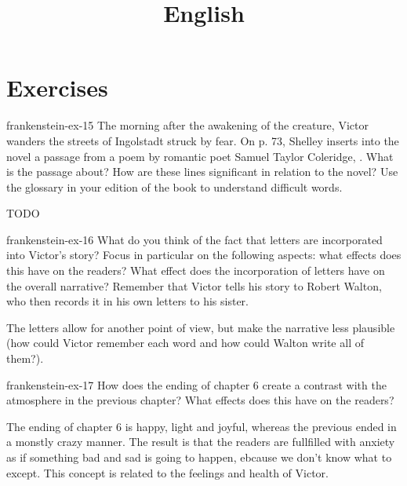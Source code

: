 \documentclass[preview]{standalone}
\begin{document}
\title{English}
\genpage

\section{Exercises}

\begin{snippetexercise}{frankenstein-ex-15}
    {The morning after the awakening of the creature, Victor wanders the streets of Ingolstadt struck
    by fear. On p. 73, Shelley inserts into the novel a passage from a poem by romantic poet Samuel
    Taylor Coleridge, . What is the passage about? How are these
    lines significant in relation to the novel? Use the glossary in your edition of the book to understand
    difficult words.}
    
    \begin{center}
    \end{center}
    
    TODO 
\end{snippetexercise}

\begin{snippetexercise}{frankenstein-ex-16}
    {What do you think of the fact that letters are incorporated into Victor's story? Focus in particular
    on the following aspects: what effects does this have on the readers? What effect does the
    incorporation of letters have on the overall narrative? Remember that Victor tells his story to Robert
    Walton, who then records it in his own letters to his sister.}
    
    The letters allow for another point of view, but make the narrative less plausible
    (how could Victor remember each word and how could Walton write all of them?).
\end{snippetexercise}

\begin{snippetexercise}{frankenstein-ex-17}
    {How does the ending of chapter 6 create a contrast with the atmosphere in the previous chapter?
    What effects does this have on the readers?}
    
    The ending of chapter 6 is happy, light and joyful, whereas the previous
    ended in a monstly crazy manner. The result is that the readers are fullfilled with anxiety
    as if something bad and sad is going to happen, ebcause we don't know what to except.
    This concept is related to the feelings and health of Victor.
\end{snippetexercise}
\end{document}

